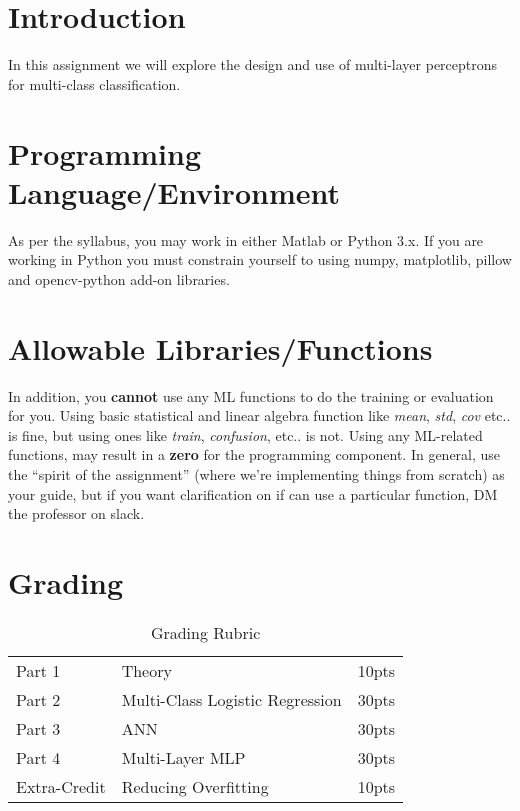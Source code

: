 \documentclass[12pt]{article}
\begin{document}
\maketitle


\section*{Introduction}
In this assignment we will explore the design and use of multi-layer perceptrons for multi-class classification.\\

\section*{Programming Language/Environment}
As per the syllabus, you may work in either Matlab or Python 3.x.  If you are working in Python you must constrain yourself to using numpy, matplotlib, pillow and opencv-python add-on libraries.

\section*{Allowable Libraries/Functions}
In addition, you \textbf{cannot} use any ML functions to do the training or evaluation for you.  Using basic statistical and linear algebra function like \emph{mean}, \emph{std}, \emph{cov} etc.. is fine, but using ones like \emph{train}, \emph{confusion}, etc.. is not. Using any ML-related functions, may result in a \textbf{zero} for the programming component.  In general, use the ``spirit of the assignment'' (where we're implementing things from scratch) as your guide, but if you want clarification on if can use a particular function, DM the professor on slack.


\section*{Grading}
\begin{table}[h]
\begin{center}
\begin{tabular}{|ll|l|}
\hline
Part 1 &Theory &10pts\\
Part 2 &Multi-Class Logistic Regression & 30pts\\
Part 3 &ANN & 30pts\\
Part 4 &Multi-Layer MLP & 30pts\\
\hline
Extra-Credit & Reducing Overfitting & 10pts\\

\hline
\end{tabular}
\caption{Grading Rubric}
\end{center}
\end{table}
\end{document}
